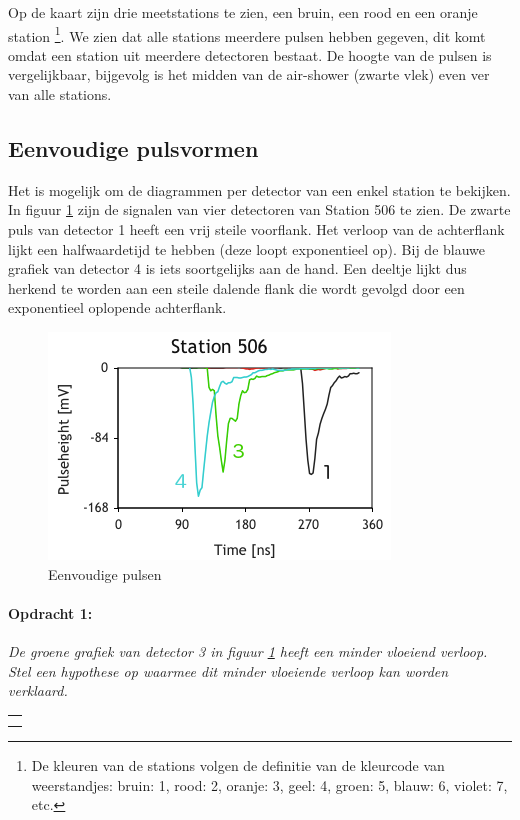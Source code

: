 Op de kaart zijn drie meetstations te zien, een bruin, een rood en
een oranje station%
\footnote{De kleuren van de stations volgen de definitie van de kleurcode van
weerstandjes: bruin: 1, rood: 2, oranje: 3, geel: 4, groen: 5, blauw:
6, violet: 7, etc. %
}. We zien dat alle stations meerdere pulsen hebben gegeven, dit komt
omdat een station uit meerdere detectoren bestaat. De hoogte van de
pulsen is vergelijkbaar, bijgevolg is het midden van de air-shower
(zwarte vlek) even ver van alle stations. 


\subsection{Eenvoudige pulsvormen}

Het is mogelijk om de diagrammen per detector van een enkel station
te bekijken. In figuur \ref{fig:Eenvoudige-pulsen} zijn de signalen
van vier detectoren van Station 506 te zien. De zwarte puls van detector
1 heeft een vrij steile voorflank. Het verloop van de achterflank
lijkt een halfwaardetijd te hebben (deze loopt exponentieel op). Bij
de blauwe grafiek van detector 4 is iets soortgelijks aan de hand.
Een deeltje lijkt dus herkend te worden aan een steile dalende flank
die wordt gevolgd door een exponentieel oplopende achterflank.

\begin{figure}[h]
\noindent \begin{centering}
\includegraphics[scale=0.65]{Figures/Traces506}
\par\end{centering}

\caption{\label{fig:Eenvoudige-pulsen}Eenvoudige pulsen}
\end{figure}


\begin{minipage}[t]{1\columnwidth}%

\paragraph{Opdracht 1:}

\textit{De groene grafiek van detector 3 in figuur \ref{fig:Eenvoudige-pulsen}
heeft een minder vloeiend verloop. Stel een hypothese op waarmee dit
minder vloeiende verloop kan worden verklaard. }

\begin{tabular}{>{\raggedright}p{16.6cm}}
\tabularnewline
\hline 
\tabularnewline
\hline 
\tabularnewline
\hline 
\tabularnewline
\hline 
\end{tabular}%
\end{minipage}

